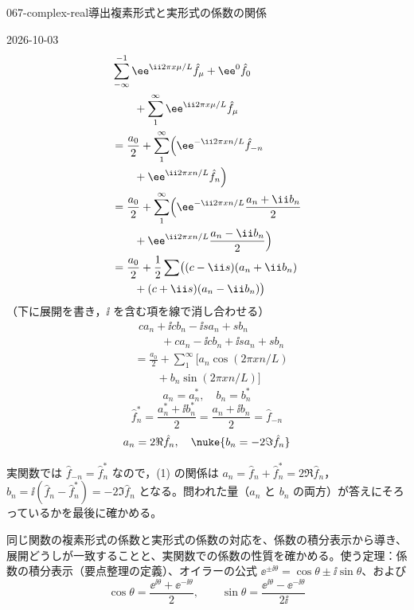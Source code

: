 \documentclass[uplatex,dvipdfmx,a4paper,11pt]{jsarticle}
\begin{document}
\begin{mondai}{067-complex-real}{導出}{複素形式と実形式の係数の関係}
\begin{kotaeutsushi}{2026-10-03}
\begin{align*}
  &\sum_{-\infty}^{-1}\ee^{\ii2\pi x\mu/L}\hat{f}_{\mu}+\ee^{0}\hat{f}_0\\
  &\qquad+\sum_{1}^{\infty}\ee^{\ii2\pi x\mu/L}\hat{f}_{\mu}\\
  &=\frac{a_0}{2}+\sum_{1}^{\infty}\Bigl(\ee^{-\ii2\pi xn/L}\hat{f}_{-n}\\
  &\qquad+\ee^{\ii2\pi xn/L}\hat{f}_{n}\Bigr)\\
  &=\frac{a_0}{2}+\sum_{1}^{\infty}\Bigl(\ee^{-\ii2\pi xn/L}\frac{a_n+\ii b_n}{2}\\
  &\qquad+\ee^{\ii2\pi xn/L}\frac{a_n-\ii b_n}{2}\Bigr)\\
  &=\frac{a_0}{2}+\frac{1}{2}\sum\bigl((c-\ii s)(a_n+\ii b_n)\\
  &\qquad+(c+\ii s)(a_n-\ii b_n)\bigr)
\end{align*}
（下に展開を書き，$\ii$ を含む項を線で消し合わせる）
\begin{align*}
  &ca_n+\ii cb_n-\ii sa_n+sb_n\\
  &\qquad+ca_n-\ii cb_n+\ii sa_n+sb_n
\end{align*}
\begin{align*}
  &=\frac{a_0}{2}+\sum_{1}^{\infty}\bigl[a_n\cos(2\pi xn/L)\\
  &\qquad+b_n\sin(2\pi xn/L)\bigr]
\end{align*}
\[ a_n=a_n^{*},\quad b_n=b_n^{*} \]
\[ \hat{f}_n^{*}=\frac{a_n^{*}+\ii b_n^{*}}{2}=\frac{a_n+\ii b_n}{2}=\hat{f}_{-n} \]
\[ a_n=2\Re\hat{f}_n,\quad \nuke{b_n=-2\Im\hat{f}_n} \]
\end{kotaeutsushi}
\begin{kizuki}
\item 実関数では $\hat{f}_{-n}=\hat{f}_n^{*}$ なので，(1) の関係は $a_n=\hat{f}_n+\hat{f}_n^{*}=2\Re\hat{f}_n$，$b_n=\ii(\hat{f}_n-\hat{f}_n^{*})=-2\Im\hat{f}_n$ となる。問われた量（$a_n$ と $b_n$ の両方）が答えにそろっているかを最後に確かめる。
\end{kizuki}
\begin{tadashii}
\houshin 同じ関数の複素形式の係数と実形式の係数の対応を、係数の積分表示から導き、展開どうしが一致することと、実関数での係数の性質を確かめる。使う定理：係数の積分表示（要点整理の定義）、オイラーの公式 $\ee^{\pm\ii\theta}=\cos\theta\pm\ii\sin\theta$、および
\[
\cos\theta=\frac{\ee^{\ii\theta}+\ee^{-\ii\theta}}{2},\qquad \sin\theta=\frac{\ee^{\ii\theta}-\ee^{-\ii\theta}}{2\ii}
\]
\end{tadashii}
\end{mondai}
\end{document}

